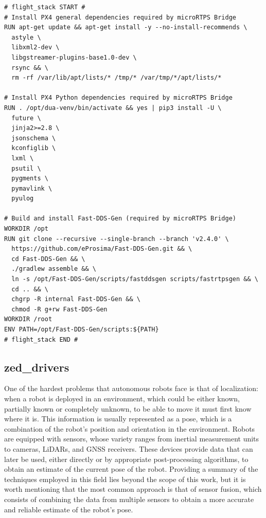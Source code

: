 \begin{center}
\begin{minipage}[t]{.9\textwidth}
\begin{lstlisting}[caption={Unit configuration of the \texttt{jetson5} target of the \texttt{flight\_stack} DUA unit \cite{masocco_flight_stack_nodate} as of November 26, 2024.}, label={lst:flightstack}]
# flight_stack START #
# Install PX4 general dependencies required by microRTPS Bridge
RUN apt-get update && apt-get install -y --no-install-recommends \
  astyle \
  libxml2-dev \
  libgstreamer-plugins-base1.0-dev \
  rsync && \
  rm -rf /var/lib/apt/lists/* /tmp/* /var/tmp/*/apt/lists/*

# Install PX4 Python dependencies required by microRTPS Bridge
RUN . /opt/dua-venv/bin/activate && yes | pip3 install -U \
  future \
  jinja2>=2.8 \
  jsonschema \
  kconfiglib \
  lxml \
  psutil \
  pygments \
  pymavlink \
  pyulog

# Build and install Fast-DDS-Gen (required by microRTPS Bridge)
WORKDIR /opt
RUN git clone --recursive --single-branch --branch 'v2.4.0' \
  https://github.com/eProsima/Fast-DDS-Gen.git && \
  cd Fast-DDS-Gen && \
  ./gradlew assemble && \
  ln -s /opt/Fast-DDS-Gen/scripts/fastddsgen scripts/fastrtpsgen && \
  cd .. && \
  chgrp -R internal Fast-DDS-Gen && \
  chmod -R g+rw Fast-DDS-Gen
WORKDIR /root
ENV PATH=/opt/Fast-DDS-Gen/scripts:${PATH}
# flight_stack END #
\end{lstlisting}
\end{minipage}
\end{center}

\subsection{zed\_drivers}
\label{sec:dua_modules_zed_drivers}
One of the hardest problems that autonomous robots face is that of localization: when a robot is deployed in an environment, which could be either known, partially known or completely unknown, to be able to move it must first know where it is. This information is usually represented as a pose, which is a combination of the robot's position and orientation in the environment. Robots are equipped with sensors, whose variety ranges from inertial measurement units to cameras, LiDARs, and GNSS receivers. These devices provide data that can later be used, either directly or by appropriate post-processing algorithms, to obtain an estimate of the current pose of the robot. Providing a summary of the techniques employed in this field lies beyond the scope of this work, but it is worth mentioning that the most common approach is that of sensor fusion, which consists of combining the data from multiple sensors to obtain a more accurate and reliable estimate of the robot's pose.

